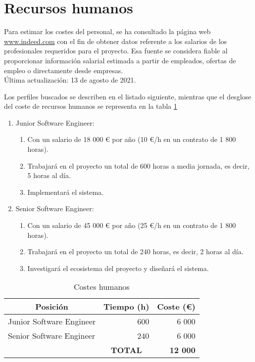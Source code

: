 \section{Recursos humanos}

Para estimar los costes del personal, se ha consultado la página web \url{www.indeed.com} con el fin de obtener datos referente a los salarios de los profesionales requeridos para el proyecto. Esa fuente se considera fiable al proporcionar información salarial estimada a partir de empleados, ofertas de empleo o directamente desde empresas. \\
Última actualización: 13 de agosto de 2021.

Los perfiles buscados se describen en el listado siguiente, mientras que el desglose del coste de recursos humanos se representa en la tabla \ref{tab:presupuesto-humanos}
\begin{enumerate}
	\item Junior Software Engineer:
	\begin{enumerate}
		\item Con un salario de 18 000 € por año (10 €/h en un contrato de 1 800 horas).
		\item Trabajará en el proyecto un total de 600 horas a media jornada, es decir, 5 horas al día.
		\item Implementará el sistema.
	\end{enumerate}

	\item Senior Software Engineer:
	\begin{enumerate}
		\item Con un salario de 45 000 € por año (25 €/h en un contrato de 1 800 horas).
		\item Trabajará en el proyecto un total de 240 horas, es decir, 2 horas al día.
		\item Investigará el ecosistema del proyecto y diseñará el sistema.
	\end{enumerate}
\end{enumerate}


\begin{table}[H]
\centering

\begin{tabular}{lcr}
\hline
\multicolumn{1}{c}{\textbf{Posición}} & \textbf{Tiempo (h)}     & \multicolumn{1}{c}{\textbf{Coste (€)}} \\ \hline
Junior Software Engineer              & \multicolumn{1}{r}{600} & 6 000                                   \\
Senior Software Engineer              & \multicolumn{1}{r}{240} & 6 000                                   \\ \hline
                                      & \textbf{TOTAL}          & \textbf{12 000}
\end{tabular}%
\caption{Costes humanos}
\label{tab:presupuesto-humanos}
\end{table}

